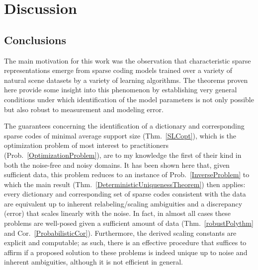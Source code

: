 \chapter{Discussion}\label{Discussion}

\section{Conclusions}

The main motivation for this work was the observation that characteristic sparse representations emerge from sparse coding models trained over a variety of natural scene datasets by a variety of learning algorithms. The theorems proven here provide some insight into this phenomenon by establishing very general conditions under which identification of the model parameters is not only possible but also robust to measurement and modeling error.

The guarantees concerning the identification of a dictionary and corresponding sparse codes of minimal average support size (Thm.~\ref{SLCopt}), which is the optimization problem of most interest to practitioners (Prob.~\ref{OptimizationProblem}), are to my knowledge the first of their kind in both the noise-free and noisy domains. It has been shown here that, given sufficient data, this problem reduces to an instance of Prob.~\ref{InverseProblem} to which the main result (Thm.~\ref{DeterministicUniquenessTheorem}) then applies: every dictionary and corresponding set of sparse codes consistent with the data are equivalent up to inherent relabeling/scaling ambiguities and a discrepancy (error) that scales linearly with the noise. 
In fact, %
in almost all cases these problems are well-posed given a sufficient amount of data (Thm.~\ref{robustPolythm} and Cor.~\ref{ProbabilisticCor}). 
Furthermore, the derived scaling constants are explicit and computable; as such, there is an effective procedure that suffices to affirm if a proposed solution to these problems is indeed unique up to noise and inherent ambiguities, although it is not efficient in general. %



